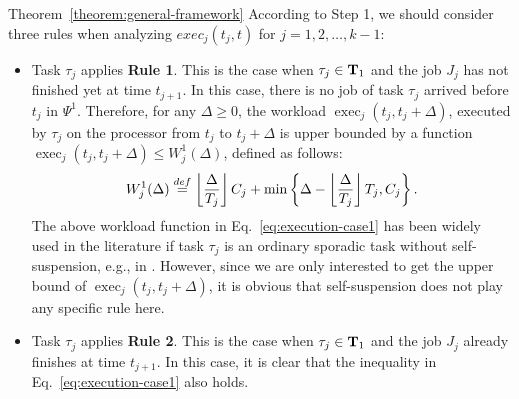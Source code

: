 \begin{appProof}{Theorem~\ref{theorem:general-framework}}
According to Step 1, we should consider three rules when analyzing $exec_j(t_j, t)$ for $j=1,2,\ldots,k-1$:
\begin{itemize}
\item Task $\tau_j$ applies {\bf Rule 1}. This is the case when
  $\tau_j \in {\bf T}_1$ and the job $J_j$ has not finished yet at
  time $t_{j+1}$. In this case, there is no job of task $\tau_j$
  arrived before $t_j$ in $\Psi^1$.  Therefore, for any $\Delta \geq
  0$, the workload $\operatorname{exec}_j(t_j, t_j+\Delta)$, executed by $\tau_j$ on the
  processor from $t_j$ to $t_j+\Delta$ is upper bounded by a function $\operatorname{exec}_j(t_j, t_j+\Delta)  \leq W_j^1(\Delta)$, defined as follows:
{\footnotesize \begin{equation}
  \label{eq:execution-case1}
  W_j^1(\Delta) \stackrel{\mbox{def}}{=} \floor{\frac{\Delta}{T_j}}C_j + \min\left\{\Delta-\floor{\frac{\Delta}{T_j}}T_j, C_j\right\}.
\end{equation}}The above workload function in Eq.~\eqref{eq:execution-case1} has been widely used in the literature if task $\tau_j$ is an ordinary sporadic task without self-suspension, e.g., in \cite{bertogna2006new}. However, since we are only interested to get the upper bound  of $\operatorname{exec}_j(t_j, t_j+\Delta)$, it is obvious that self-suspension does not play any specific rule here.

\item Task $\tau_j$ applies {\bf Rule 2}. This is the case when
  $\tau_j \in {\bf T}_1$ and the job $J_j$ already finishes at time
  $t_{j+1}$. In this case, it is clear that the inequality in
  Eq.~\eqref{eq:execution-case1} also holds.


\end{itemize}
\end{appProof}

